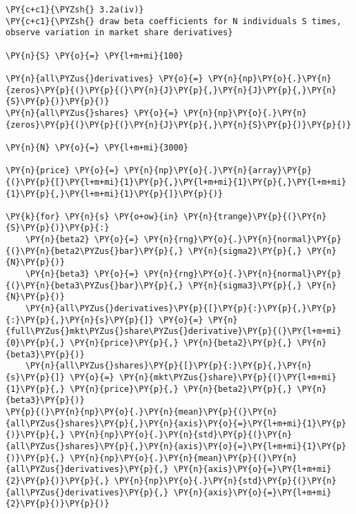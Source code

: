    \begin{tcolorbox}[breakable, size=fbox, boxrule=1pt, pad at break*=1mm,colback=cellbackground, colframe=cellborder]
\begin{Verbatim}[commandchars=\\\{\}]
\PY{c+c1}{\PYZsh{} 3.2a(iv)}
\PY{c+c1}{\PYZsh{} draw beta coefficients for N individuals S times, observe variation in market share derivatives}

\PY{n}{S} \PY{o}{=} \PY{l+m+mi}{100}

\PY{n}{all\PYZus{}derivatives} \PY{o}{=} \PY{n}{np}\PY{o}{.}\PY{n}{zeros}\PY{p}{(}\PY{p}{(}\PY{n}{J}\PY{p}{,}\PY{n}{J}\PY{p}{,}\PY{n}{S}\PY{p}{)}\PY{p}{)}
\PY{n}{all\PYZus{}shares} \PY{o}{=} \PY{n}{np}\PY{o}{.}\PY{n}{zeros}\PY{p}{(}\PY{p}{(}\PY{n}{J}\PY{p}{,}\PY{n}{S}\PY{p}{)}\PY{p}{)}

\PY{n}{N} \PY{o}{=} \PY{l+m+mi}{3000}

\PY{n}{price} \PY{o}{=} \PY{n}{np}\PY{o}{.}\PY{n}{array}\PY{p}{(}\PY{p}{[}\PY{l+m+mi}{1}\PY{p}{,}\PY{l+m+mi}{1}\PY{p}{,}\PY{l+m+mi}{1}\PY{p}{,}\PY{l+m+mi}{1}\PY{p}{]}\PY{p}{)}

\PY{k}{for} \PY{n}{s} \PY{o+ow}{in} \PY{n}{trange}\PY{p}{(}\PY{n}{S}\PY{p}{)}\PY{p}{:}
    \PY{n}{beta2} \PY{o}{=} \PY{n}{rng}\PY{o}{.}\PY{n}{normal}\PY{p}{(}\PY{n}{beta2\PYZus{}bar}\PY{p}{,} \PY{n}{sigma2}\PY{p}{,} \PY{n}{N}\PY{p}{)}
    \PY{n}{beta3} \PY{o}{=} \PY{n}{rng}\PY{o}{.}\PY{n}{normal}\PY{p}{(}\PY{n}{beta3\PYZus{}bar}\PY{p}{,} \PY{n}{sigma3}\PY{p}{,} \PY{n}{N}\PY{p}{)}
    \PY{n}{all\PYZus{}derivatives}\PY{p}{[}\PY{p}{:}\PY{p}{,}\PY{p}{:}\PY{p}{,}\PY{n}{s}\PY{p}{]} \PY{o}{=} \PY{n}{full\PYZus{}mkt\PYZus{}share\PYZus{}derivative}\PY{p}{(}\PY{l+m+mi}{0}\PY{p}{,} \PY{n}{price}\PY{p}{,} \PY{n}{beta2}\PY{p}{,} \PY{n}{beta3}\PY{p}{)}
    \PY{n}{all\PYZus{}shares}\PY{p}{[}\PY{p}{:}\PY{p}{,}\PY{n}{s}\PY{p}{]} \PY{o}{=} \PY{n}{mkt\PYZus{}share}\PY{p}{(}\PY{l+m+mi}{1}\PY{p}{,} \PY{n}{price}\PY{p}{,} \PY{n}{beta2}\PY{p}{,} \PY{n}{beta3}\PY{p}{)}
\PY{p}{(}\PY{n}{np}\PY{o}{.}\PY{n}{mean}\PY{p}{(}\PY{n}{all\PYZus{}shares}\PY{p}{,}\PY{n}{axis}\PY{o}{=}\PY{l+m+mi}{1}\PY{p}{)}\PY{p}{,} \PY{n}{np}\PY{o}{.}\PY{n}{std}\PY{p}{(}\PY{n}{all\PYZus{}shares}\PY{p}{,}\PY{n}{axis}\PY{o}{=}\PY{l+m+mi}{1}\PY{p}{)}\PY{p}{,} \PY{n}{np}\PY{o}{.}\PY{n}{mean}\PY{p}{(}\PY{n}{all\PYZus{}derivatives}\PY{p}{,} \PY{n}{axis}\PY{o}{=}\PY{l+m+mi}{2}\PY{p}{)}\PY{p}{,} \PY{n}{np}\PY{o}{.}\PY{n}{std}\PY{p}{(}\PY{n}{all\PYZus{}derivatives}\PY{p}{,} \PY{n}{axis}\PY{o}{=}\PY{l+m+mi}{2}\PY{p}{)}\PY{p}{)}
\end{Verbatim}
\end{tcolorbox}


